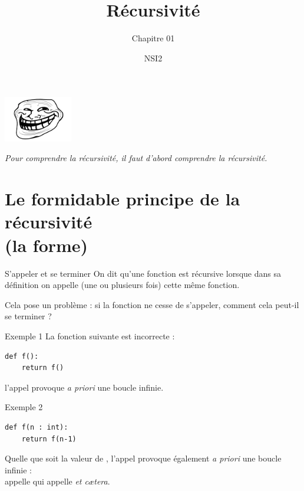 \documentclass[10pt]{beamer}
\subtitle{Chapitre 01}
\title{Récursivité}
\author{NSI2}
\begin{document}
\maketitle
\begin{frame}
\begin{center}
\includegraphics[width=3cm]{img/troll}
\end{center}\pause
\textit{Pour comprendre la récursivité, il faut d'abord comprendre la récursivité.}\\
\end{frame}




\section{Le formidable principe de la récursivité\\ (la forme)}




\begin{frame}{S'appeler et se terminer}
On dit qu'une fonction est \alert{récursive} lorsque dans sa définition on appelle (une ou plusieurs fois)
cette même fonction.\\\pause

Cela pose un problème : si la fonction ne cesse de s'appeler, comment
cela peut-il se terminer ?
\end{frame}




\begin{frame}[fragile]{Exemple 1}
La fonction suivante est incorrecte :
\begin{verbatim}
def f():
    return f()
\end{verbatim}
\pause
l'appel  provoque \textit{a priori} une boucle infinie.
\end{frame}




\begin{frame}[fragile]{Exemple 2}
\begin{verbatim}
def f(n : int):
    return f(n-1)
\end{verbatim}
\pause
Quelle que soit la valeur de , l'appel  provoque également \textit{a priori} une boucle infinie :\\\pause
{} appelle  qui appelle  \textit{et c\ae tera}.
\end{frame}
\end{document}
